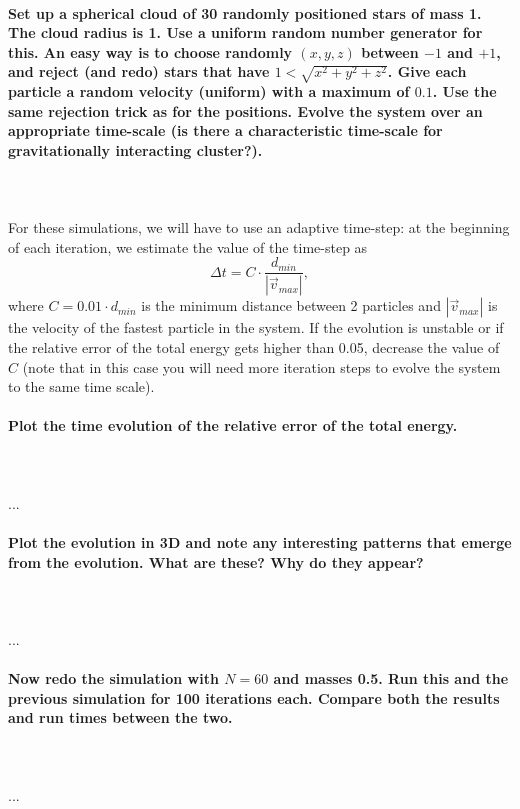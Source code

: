     \paragraph{Set up a spherical cloud of 30 randomly positioned stars of 
        mass 1. The cloud radius is 1. Use a uniform random number generator 
        for this. An easy way is to choose randomly $(x,y,z)$ between 
        $-1$ and $+1$, and reject (and redo) stars that have 
        $1<\sqrt{x^2+y^2+z^2}$. Give each particle a random velocity
        (uniform) with a maximum of $0.1$. Use the same rejection trick as for 
        the positions. Evolve the system over an appropriate time-scale 
        (is there a characteristic time-scale for gravitationally interacting
        cluster?). 
    } \ \\
        \\
        For these simulations, we will have to use an adaptive time-step: at the 
        beginning of each iteration, we estimate the value of the time-step as 
        \begin{equation}
            \Delta t = C\cdot\frac{d_{min}}{|\vec v_{max}|},
        \end{equation}
        where $C=0.01\cdot d_{min}$ is the minimum distance between 2 particles 
        and $|\vec v_{max}|$ is the velocity of the fastest particle in the 
        system. If the evolution is unstable or if the relative error of the 
        total energy gets higher than 0.05, decrease the value of $C$ (note 
        that in this case you will need more iteration steps to evolve the 
        system to the same time scale).

    \paragraph{Plot the time evolution of the relative error of the total 
        energy.
    } \ \\
        \\ 
        ...

    \paragraph{Plot the evolution in 3D and note any interesting patterns that 
        emerge from the evolution. What are these? Why do they appear?
    } \ \\
        \\
        ...

    \paragraph{Now redo the simulation with $N=60$ and masses 0.5. Run this and 
        the previous simulation for 100 iterations each. Compare both the 
        results and run times between the two.
    } \ \\
        \\
        ...
